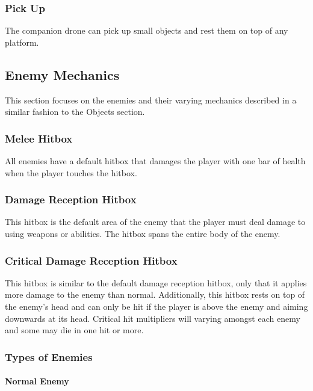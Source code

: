 \documentclass[12pt]{article}
\begin{document}
\subsubsection{Pick Up}

The companion drone can pick up small objects and rest them on top of any platform.

\subsection{Enemy Mechanics}

This section focuses on the enemies and their varying mechanics described in a similar fashion to the Objects section. 

\subsubsection{Melee Hitbox}

All enemies have a default hitbox that damages the player with one bar of health when the player touches the hitbox. 

\subsubsection{Damage Reception Hitbox}

This hitbox is the default area of the enemy that the player must deal damage to using weapons or abilities. The hitbox spans the entire body of the enemy.

\subsubsection{Critical Damage Reception Hitbox}

This hitbox is similar to the default damage reception hitbox, only that it applies more damage to the enemy than normal. Additionally, this hitbox rests on top of the enemy's head and can only be hit if the player is above the enemy and aiming downwards at its head. Critical hit multipliers will varying amongst each enemy and some may die in one hit or more. 

\subsubsection{Types of Enemies}

\paragraph{Normal Enemy}
\end{document}
